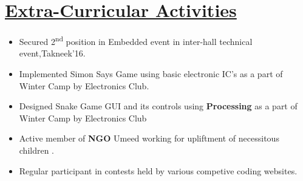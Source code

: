 \documentclass{article}
\begin{document}
\section*{\underline{Extra-Curricular Activities}}
\begin{itemize}
\item Secured 2\textsuperscript{nd} position in Embedded event in inter-hall technical event,Takneek'16. 
\item Implemented Simon Says Game using basic electronic IC's as a part of Winter Camp by Electronics Club.
\item Designed Snake Game GUI and its controls using \textbf{Processing} as a part of Winter Camp by Electronics Club  
\item Active member of \textbf{NGO} Umeed working for upliftment of necessitous children .
\item Regular participant in contests held by various competive coding websites. 



\end{itemize} 
\end{document}
